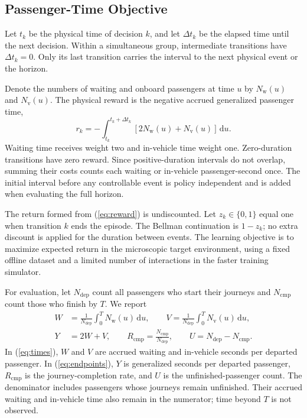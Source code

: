 \documentclass[letterpaper,journal]{IEEEtran}
\newcommand{\Rcmp}{R_{\mathrm{cmp}}}
\newcommand{\Ndep}{N_{\mathrm{dep}}}
\newcommand{\Ncmp}{N_{\mathrm{cmp}}}
\begin{document}
\subsection{Passenger-Time Objective}
Let \(t_k\) be the physical time of decision \(k\), and let \(\Delta t_k\) be the elapsed time until the next decision. Within a simultaneous group, intermediate transitions have \(\Delta t_k=0\). Only its last transition carries the interval to the next physical event or the horizon.

Denote the numbers of waiting and onboard passengers at time \(u\) by \(N_{\mathrm{w}}(u)\) and \(N_{\mathrm{v}}(u)\). The physical reward is the negative accrued generalized passenger time,
\begin{equation}
 r_k=-\int_{t_k}^{t_k+\Delta t_k}
       [2N_{\mathrm{w}}(u)+N_{\mathrm{v}}(u)]\,\mathrm{d}u .
 \label{eq:reward}
\end{equation}
Waiting time receives weight two and in-vehicle time weight one. Zero-duration transitions have zero reward. Since positive-duration intervals do not overlap, summing their costs counts each waiting or in-vehicle passenger-second once. The initial interval before any controllable event is policy independent and is added when evaluating the full horizon.

The return formed from (\ref{eq:reward}) is undiscounted. Let \(z_k\in\{0,1\}\) equal one when transition \(k\) ends the episode. The Bellman continuation is \(1-z_k\); no extra discount is applied for the duration between events. The learning objective is to maximize expected return in the microscopic target environment, using a fixed offline dataset and a limited number of interactions in the faster training simulator.

For evaluation, let \(\Ndep\) count all passengers who start their journeys and \(\Ncmp\) count those who finish by \(T\). We report
\begin{align}
 W&=\frac{1}{\Ndep}\int_0^T N_{\mathrm{w}}(u)\,\mathrm{d}u,\qquad
 V=\frac{1}{\Ndep}\int_0^T N_{\mathrm{v}}(u)\,\mathrm{d}u,
 \label{eq:times}\\
 Y&=2W+V,\qquad
 \Rcmp=\frac{\Ncmp}{\Ndep},\qquad
 U=\Ndep-\Ncmp .
 \label{eq:endpoints}
\end{align}
In (\ref{eq:times}), \(W\) and \(V\) are accrued waiting and in-vehicle seconds per departed passenger. In (\ref{eq:endpoints}), \(Y\) is generalized seconds per departed passenger, \(\Rcmp\) is the journey-completion rate, and \(U\) is the unfinished-passenger count. The denominator includes passengers whose journeys remain unfinished. Their accrued waiting and in-vehicle time also remain in the numerator; time beyond \(T\) is not observed.
\end{document}
